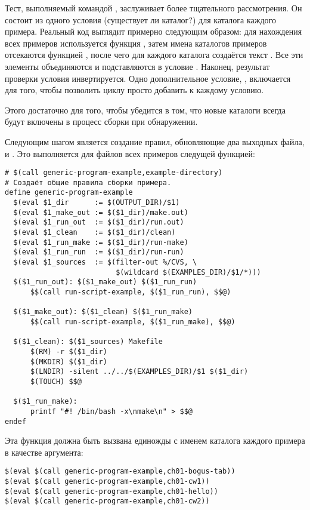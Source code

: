 Тест, выполняемый командой , заслуживает более тщательного
рассмотрения. Он состоит из одного условия  (существует ли
каталог?) для каталога каждого примера. Реальный код выглядит примерно
следующим образом: для нахождения всех примеров используется функция
, затем имена каталогов примеров отсекаются
функцией , после чего для каждого каталога создаётся
текст . Все эти
элементы объединяются и подставляются в условие . Наконец, результат проверки условия
инвертируется. Одно дополнительное условие, , включается
для того, чтобы позволить циклу  просто добавить
\command{\&\&} к каждому условию.

Этого достаточно для того, чтобы убедится в том, что новые каталоги
всегда будут включены в процесс сборки при обнаружении.

Следующим шагом является создание правил, обновляющие два выходных
файла,  и . Это выполняется для
 файлов всех примеров следущей функцией:

\footnotesize{
\begin{verbatim}
# $(call generic-program-example,example-directory)
# Создаёт общие правила сборки примера.
define generic-program-example
  $(eval $1_dir      := $(OUTPUT_DIR)/$1)
  $(eval $1_make_out := $($1_dir)/make.out)
  $(eval $1_run_out  := $($1_dir)/run.out)
  $(eval $1_clean    := $($1_dir)/clean)
  $(eval $1_run_make := $($1_dir)/run-make)
  $(eval $1_run_run  := $($1_dir)/run-run)
  $(eval $1_sources  := $(filter-out %/CVS, \
                          $(wildcard $(EXAMPLES_DIR)/$1/*)))
  $($1_run_out): $($1_make_out) $($1_run_run)
      $$(call run-script-example, $($1_run_run), $$@)

  $($1_make_out): $($1_clean) $($1_run_make)
      $$(call run-script-example, $($1_run_make), $$@)

  $($1_clean): $($1_sources) Makefile
      $(RM) -r $($1_dir)
      $(MKDIR) $($1_dir)
      $(LNDIR) -silent ../../$(EXAMPLES_DIR)/$1 $($1_dir)
      $(TOUCH) $$@

  $($1_run_make):
      printf "#! /bin/bash -x\nmake\n" > $$@
endef
\end{verbatim}
}

Эта функция должна быть вызвана единожды с именем каталога каждого
примера в качестве аргумента:

\footnotesize{
\begin{verbatim}
$(eval $(call generic-program-example,ch01-bogus-tab))
$(eval $(call generic-program-example,ch01-cw1))
$(eval $(call generic-program-example,ch01-hello))
$(eval $(call generic-program-example,ch01-cw2))
\end{verbatim}
}


